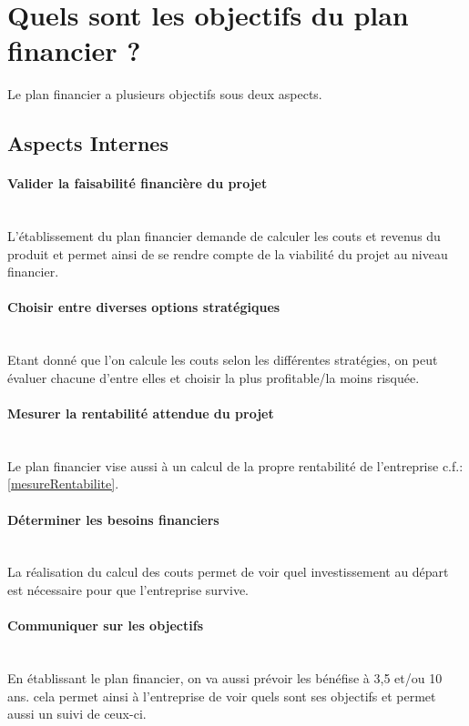\documentclass{article}
\begin{document}
\section{Quels sont les objectifs du plan financier ?} %
Le plan financier a plusieurs objectifs sous deux aspects.
	\subsection{Aspects Internes}
		\paragraph{Valider la faisabilité financière du projet}~\\
			L'établissement du plan financier demande de calculer les couts et revenus du produit et permet ainsi de se rendre compte de la viabilité du projet au niveau financier.
			
		\paragraph{Choisir entre diverses options stratégiques}~\\
			Etant donné que l'on calcule les couts selon les différentes stratégies, on peut évaluer chacune d'entre elles et choisir la plus profitable/la moins risquée.
			
		\paragraph{Mesurer la rentabilité attendue du projet}~\\
			Le plan financier vise aussi à un calcul de la propre rentabilité de l'entreprise c.f.:\ref{mesureRentabilite}.
			
		\paragraph{Déterminer les besoins financiers}~\\
			La réalisation du calcul des couts permet de voir quel investissement au départ est nécessaire pour que l'entreprise survive.
		\paragraph{Communiquer sur les objectifs}~\\
			En établissant le plan financier, on va aussi prévoir les bénéfise à 3,5 et/ou 10 ans. cela permet ainsi à l'entreprise de voir quels sont ses objectifs et permet aussi un suivi de ceux-ci.
		
\end{document}
